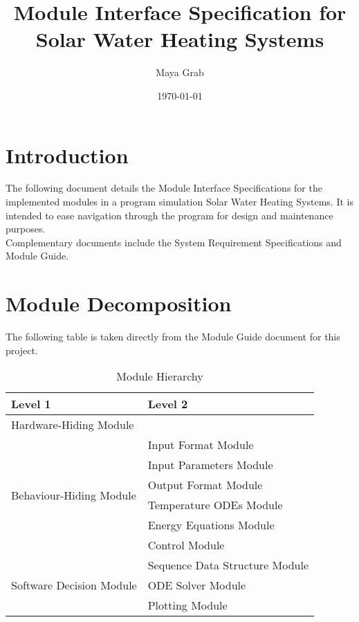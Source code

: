 \documentclass[12pt]{article}
\begin{document}
\title{Module Interface Specification for Solar Water Heating Systems}
\author{Maya Grab}
\date{\today}
	
\maketitle

\tableofcontents

\section{Introduction}
The following document details the Module Interface Specifications for the implemented 
modules in a program simulation Solar Water Heating Systems. %
 It is intended to ease navigation through the program for design and maintenance purposes.\\
  Complementary documents include the System Requirement Specifications and Module Guide. 

\section{Module Decomposition}
The following table is taken directly from the Module Guide document for this project.
\begin{table}[!h]
\centering
\begin{tabular}{p{} p{}}
\toprule%
\textbf{Level 1} & \textbf{Level 2}\\
\midrule

{Hardware-Hiding Module} & ~ \\
\midrule

\multirow{6}{0.3\textwidth}{Behaviour-Hiding Module} & Input Format Module\\
& Input Parameters Module\\
& Output Format Module\\
& Temperature ODEs Module\\
& Energy Equations Module\\ 
& Control Module\\
\midrule

\multirow{3}{0.3\textwidth}{Software Decision Module} & {Sequence Data Structure Module}\\
& ODE Solver Module\\
& Plotting Module\\
\bottomrule

\end{tabular}
\caption{Module Hierarchy}
\label{TblMH}
\end{table}
\end{document}

